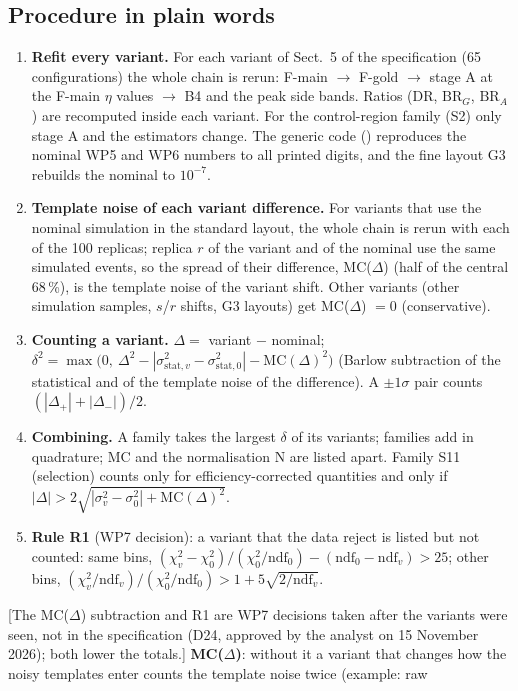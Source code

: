 \documentclass[11pt,a4paper]{article}
\newcommand{\code}[1]{\texttt{\detokenize{#1}}}
\newcommand{\BRG}{\ensuremath{\mathrm{BR}_G}\xspace}
\newcommand{\BRA}{\ensuremath{\mathrm{BR}_A}\xspace}
\newcommand{\flag}[1]{\textcolor{red!60!black}{[#1]}}
\begin{document}
\subsection{Procedure in plain words}
\begin{enumerate}\setlength{\itemsep}{0pt}
\item \textbf{Refit every variant.} For each variant of Sect.~5 of the specification (65 configurations) the whole chain is rerun: F-main
      $\to$ F-gold $\to$ stage A at the F-main $\eta$ values $\to$ B4 and the peak side bands. Ratios (DR, \BRG, \BRA) are recomputed inside each
      variant. For the control-region family (S2) only stage A and the estimators change. The generic code (\code{wp7_lib.h}) reproduces
      the nominal WP5 and WP6 numbers to all printed digits, and the fine layout G3 rebuilds the nominal to $10^{-7}$.
\item \textbf{Template noise of each variant difference.} For variants that use the nominal simulation in the standard layout, the whole
      chain is rerun with each of the 100 replicas; replica $r$ of the variant and of the nominal use the same simulated events, so the spread
      of their difference, MC($\Delta$) (half of the central 68\,\%), is the template noise of the variant shift. Other variants
      (other simulation samples, $s$/$r$ shifts, G3 layouts) get MC($\Delta$) $=0$ (conservative).
\item \textbf{Counting a variant.} $\Delta=$ variant $-$ nominal;
      $\delta^2=\max\big(0,\ \Delta^2-|\sigma_{\mathrm{stat},v}^2-\sigma_{\mathrm{stat},0}^2|-\mathrm{MC}(\Delta)^2\big)$ (Barlow subtraction of the
      statistical and of the template noise of the difference). A $\pm1\sigma$ pair counts $(|\Delta_+|+|\Delta_-|)/2$.
\item \textbf{Combining.} A family takes the largest $\delta$ of its variants; families add in quadrature; MC and the normalisation N are
      listed apart. Family S11 (selection) counts only for efficiency-corrected quantities and only if $|\Delta|>2\sqrt{|\sigma_v^2-\sigma_0^2|+
      \mathrm{MC}(\Delta)^2}$.
\item \textbf{Rule R1} (WP7 decision): a variant that the data reject is listed but not counted: same bins,
      $(\chi^2_v-\chi^2_0)/(\chi^2_0/\mathrm{ndf}_0)-(\mathrm{ndf}_0-\mathrm{ndf}_v)>25$; other bins, $(\chi^2_v/\mathrm{ndf}_v)/(\chi^2_0/\mathrm{ndf}_0)>1+5\sqrt{2/\mathrm{ndf}_v}$.
\end{enumerate}
\flag{The MC($\Delta$) subtraction and R1 are WP7 decisions taken after the variants were seen, not in the specification (D24, approved by the analyst on 15 November 2026); both lower the
totals.} \textbf{MC($\Delta$)}: without it a variant that changes how the noisy templates enter counts the template noise twice (example: raw
\end{document}
